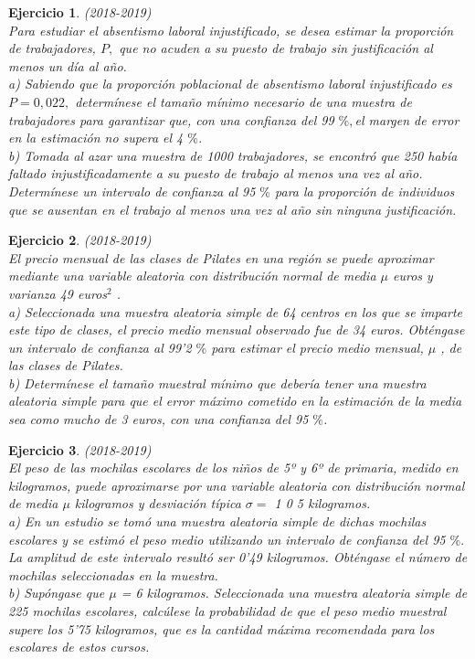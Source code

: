 \documentclass[12pt, a4paper]{amsart}
\newtheorem{ejer}{Ejercicio}
\begin{document}
\begin{ejer}\em (2018-2019)\\
Para estudiar el absentismo laboral injustificado, se desea estimar la proporción de trabajadores, $P,$ que no
acuden a su puesto de trabajo sin justificación al menos un día al año.\\
a) Sabiendo que la proporción poblacional de absentismo laboral injustificado es $P = 0,022,$ determínese el
tamaño mínimo necesario de una muestra de trabajadores para garantizar que, con una confianza del 99 $\%,$el
margen de error en la estimación no supera el 4 $\%$. \\
b) Tomada al azar una muestra de 1000 trabajadores, se encontró que 250 había faltado injustificadamente a
su puesto de trabajo al menos una vez al año. Determínese un intervalo de confianza al 95 $\%$ para la proporción
de individuos que se ausentan en el trabajo al menos una vez al año sin ninguna justificación.
\end{ejer}

\begin{ejer}\em (2018-2019)\\
El precio mensual de las clases de Pilates en una región se puede aproximar mediante una variable aleatoria
con distribución normal de media $\mu$ euros y varianza 49 euros$^2$ .\\
a) Seleccionada una muestra aleatoria simple de 64 centros en los que se imparte este tipo de clases, el precio
medio mensual observado fue de 34 euros. Obténgase un intervalo de confianza al 99’2 $\%$ para estimar el precio
medio mensual, $\mu$ , de las clases de Pilates.\\
b) Determínese el tamaño muestral mínimo que debería tener una muestra aleatoria simple para que el error
máximo cometido en la estimación de la media sea como mucho de 3 euros, con una confianza del 95 $\%$. 
\end{ejer}

\begin{ejer}\em (2018-2019)\\
El peso de las mochilas escolares de los niños de 5º y 6º de primaria, medido en kilogramos, puede aproximarse
por una variable aleatoria con distribución normal de media $\mu$ kilogramos y desviación típica  $\sigma =$ 1 0 5 kilogramos.\\
a) En un estudio se tomó una muestra aleatoria simple de dichas mochilas escolares y se estimó el peso
medio utilizando un intervalo de confianza del 95 $\%.$La amplitud de este intervalo resultó ser 0’49 kilogramos.
Obténgase el número de mochilas seleccionadas en la muestra.\\
b) Supóngase que $\mu$ = 6 kilogramos. Seleccionada una muestra aleatoria simple de 225 mochilas escolares,
calcúlese la probabilidad de que el peso medio muestral supere los 5’75 kilogramos, que es la cantidad máxima
recomendada para los escolares de estos cursos.
\end{ejer}
\end{document}
